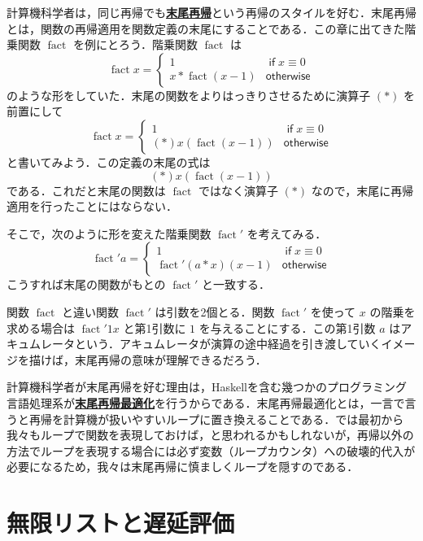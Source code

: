\documentclass[a4paper,twocolumn]{jsbook}
\newcommand{\programminglanguage}[1]{\textsf{#1}}
\newcommand{\haskell}{\programminglanguage{Haskell}}
\newcommand{\keyword}[1]{{\underline{\textbf{#1}}}}
\newcommand{\mKeyword}[1]{\mathsf{#1}} %
\newcommand{\mIfKeyword}{\mKeyword{if}}
\newcommand{\mOtherwiseKeyword}{\mKeyword{otherwise}}
\DeclareMathOperator{\mIf}{\mIfKeyword}
\DeclareMathOperator{\mOtherwise}{\mOtherwiseKeyword}
\DeclareMathOperator{\mFact}{fact}
\begin{document}
計算機科学者は，同じ再帰でも\keyword{末尾再帰}という再帰のスタイルを好む．末尾再帰とは，関数の再帰適用を関数定義の末尾にすることである．この章に出てきた階乗関数 $\mFact$ を例にとろう．階乗関数 $\mFact$ は
\begin{equation}
\mFact x=\begin{cases}
1&\mIf x\equiv0\\
x*\mFact(x-1)&\mOtherwise
\end{cases}
\end{equation}
のような形をしていた．末尾の関数をよりはっきりさせるために演算子 $(*)$ を前置にして
\begin{equation}
\mFact x=\begin{cases}
1&\mIf x\equiv0\\
(*)x(\mFact(x-1))&\mOtherwise
\end{cases}
\end{equation}
と書いてみよう．この定義の末尾の式は
\begin{equation}
(*)x(\mFact(x-1))
\end{equation}
である．これだと末尾の関数は $\mFact$ ではなく演算子 $(*)$ なので，末尾に再帰適用を行ったことにはならない．

そこで，次のように形を変えた階乗関数 $\mFact'$ を考えてみる．
\begin{equation}
\mFact' a=\begin{cases}
1&\mIf x\equiv0\\
\mFact'(a*x)(x-1)&\mOtherwise
\end{cases}
\end{equation}
こうすれば末尾の関数がもとの $\mFact'$ と一致する．

関数 $\mFact$ と違い関数 $\mFact'$ は引数を2個とる．関数 $\mFact'$ を使って $x$ の階乗を求める場合は $\mFact'1x$ と第1引数に $1$ を与えることにする．この第1引数 $a$ はアキュムレータという．アキュムレータが演算の途中経過を引き渡していくイメージを描けば，末尾再帰の意味が理解できるだろう．

計算機科学者が末尾再帰を好む理由は，\haskell を含む幾つかのプログラミング言語処理系が\keyword{末尾再帰最適化}を行うからである．末尾再帰最適化とは，一言で言うと再帰を計算機が扱いやすいループに置き換えることである．では最初から我々もループで関数を表現しておけば，と思われるかもしれないが，再帰以外の方法でループを表現する場合には必ず変数（ループカウンタ）への破壊的代入が必要になるため，我々は末尾再帰に慎ましくループを隠すのである．

\section{無限リストと遅延評価}
\end{document}
